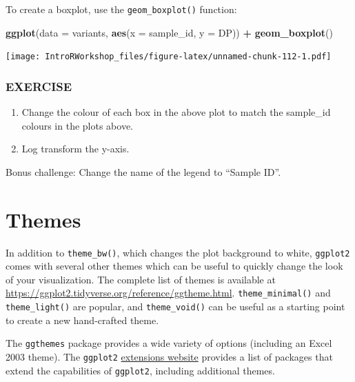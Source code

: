 \documentclass[
]{book}
\newenvironment{Shaded}{\begin{snugshade}}{\end{snugshade}}
\newcommand{\AttributeTok}[1]{\textcolor[rgb]{0.13,0.29,0.53}{#1}}
\newcommand{\FunctionTok}[1]{\textcolor[rgb]{0.13,0.29,0.53}{\textbf{#1}}}
\newcommand{\NormalTok}[1]{#1}
\newcommand{\SpecialCharTok}[1]{\textcolor[rgb]{0.81,0.36,0.00}{\textbf{#1}}}
\providecommand{\tightlist}{%
  \setlength{\itemsep}{0pt}\setlength{\parskip}{0pt}}
\begin{document}
To create a boxplot, use the \texttt{geom\_boxplot()} function:

\begin{Shaded}
\begin{Highlighting}[]
\FunctionTok{ggplot}\NormalTok{(}\AttributeTok{data =}\NormalTok{ variants, }\FunctionTok{aes}\NormalTok{(}\AttributeTok{x =}\NormalTok{ sample\_id, }\AttributeTok{y =}\NormalTok{ DP)) }\SpecialCharTok{+}
  \FunctionTok{geom\_boxplot}\NormalTok{()}
\end{Highlighting}
\end{Shaded}

\texttt{[image: IntroRWorkshop\_files/figure-latex/unnamed-chunk-112-1.pdf]}

\subsubsection*{EXERCISE}\label{exercise-7}

\begin{enumerate}
\def\labelenumi{\arabic{enumi}.}
\tightlist
\item
  Change the colour of each box in the above plot to match the sample\_id colours in the plots above.
\item
  Log transform the y-axis.
\end{enumerate}

Bonus challenge: Change the name of the legend to ``Sample ID''.

\section{Themes}\label{themes}

In addition to \texttt{theme\_bw()}, which changes the plot background to white, \texttt{ggplot2} comes with several other themes which can be useful to quickly change the look of your visualization. The complete list of themes is available at \url{https://ggplot2.tidyverse.org/reference/ggtheme.html}. \texttt{theme\_minimal()} and \texttt{theme\_light()} are popular, and \texttt{theme\_void()} can be useful as a starting point to create a new hand-crafted theme.

The \texttt{ggthemes} package provides a wide variety of options (including an Excel 2003 theme). The \texttt{ggplot2} \href{https://www.ggplot2-exts.org}{extensions website} provides a list of packages that extend the capabilities of \texttt{ggplot2}, including additional themes.
\end{document}
